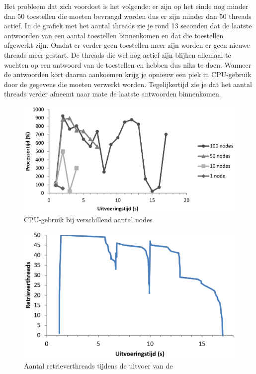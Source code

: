 Het probleem dat zich voordoet is het volgende:
er zijn op het einde nog minder dan 50 toestellen die moeten bevraagd worden dus er zijn minder dan 50 threads actief.
In de grafiek met het aantal threads zie je rond 13 seconden dat de laatste antwoorden van een aantal toestellen binnenkomen en dat die toestellen afgewerkt zijn.
Omdat er verder geen toestellen meer zijn worden er geen nieuwe threads meer gestart.
De threads die wel nog actief zijn blijken allemaal te wachten op een antwoord van de toestellen en hebben dus niks te doen.
Wanneer de antwoorden kort daarna aankoemen krijg je opnieuw een piek in CPU-gebruik door de gegevens die moeten verwerkt worden.
Tegelijkertijd zie je dat het aantal threads verder afneemt naar mate de laatste antwoorden binnenkomen.

\begin{figure}[h]
	\centering
	\includegraphics[scale=0.40]{figures/cpu-100nodes}
	\caption{CPU-gebruik bij verschillend aantal nodes}
	\label{fig-cpu-aantalnodes}
\end{figure}

\begin{figure}[h]
	\centering
	\includegraphics[scale=0.30]{figures/threads-100nodes}
	\caption{Aantal retrieverthreads tijdens de uitvoer van de \nwmretriever{}}
	\label{fig-retrieverthreads}
\end{figure}

